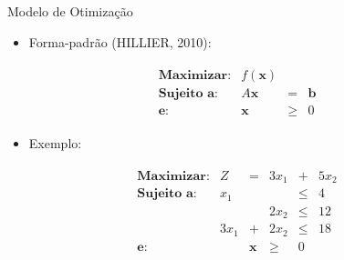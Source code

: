 \documentclass{if-beamer}
\begin{document}
\begin{frame}{Modelo de Otimização}

\begin{minipage}{.49\textwidth}

\begin{itemize}
    \item Forma-padrão (HILLIER, 2010):
\end{itemize}
\begin{align*}
\begin{matrix}
    \textbf{Maximizar:} & f(\mathbf{x}) & & \\
    \textbf{Sujeito a:} & A\mathbf{x} & = & \mathbf{b} \\
    \textbf{e:} & \mathbf{x} & \geq & 0
\end{matrix}    
\end{align*}

\vspace{.8cm}

\begin{itemize}
    \item Exemplo:
\end{itemize}
\begin{align*}
\begin{matrix}
    \textbf{Maximizar:} & Z & = & 3x_1 & + & 5x_2 \\
    \textbf{Sujeito a:} &  x_1 &   &      & \leq & 4  \\
                        &      &   & 2x_2 & \leq & 12 \\
                        & 3x_1 & + & 2x_2 & \leq & 18 \\
    \textbf{e:}         &      & \mathbf{x} & \geq & 0 & 
\end{matrix}    
\end{align*}

\end{minipage}
\begin{minipage}{.49\textwidth}


\end{minipage}
\end{frame}
\end{document}
